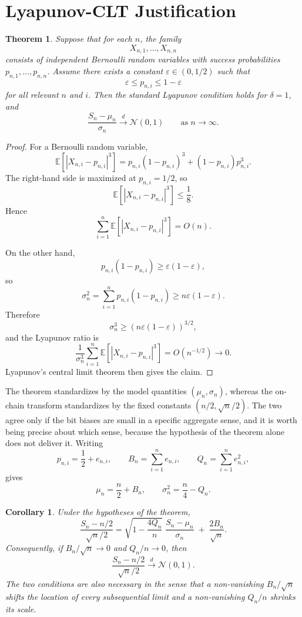 \documentclass[11pt]{article}
\newtheorem{theorem}{Theorem}
\newtheorem{corollary}{Corollary}
\begin{document}
\section{Lyapunov-CLT Justification}
\label{sec:lyapunov}

\begin{theorem}
Suppose that for each $n$, the family
\[
X_{n,1}, \dots, X_{n,n}
\]
consists of independent Bernoulli random variables with success probabilities
$p_{n,1}, \dots, p_{n,n}$. Assume there exists a constant
$\varepsilon \in (0, 1/2)$ such that
\[
\varepsilon \le p_{n,i} \le 1-\varepsilon
\]
for all relevant $n$ and $i$. Then the standard Lyapunov condition holds for
$\delta=1$, and
\[
\frac{S_n - \mu_n}{\sigma_n}
\xrightarrow{d}
\mathcal{N}(0,1)
\qquad \text{as } n \to \infty.
\]
\end{theorem}

\begin{proof}
For a Bernoulli random variable,
\[
\mathbb{E}\left[\left|X_{n,i} - p_{n,i}\right|^3\right]
= p_{n,i}(1-p_{n,i})^3 + (1-p_{n,i})p_{n,i}^3.
\]
The right-hand side is maximized at $p_{n,i}=1/2$, so
\[
\mathbb{E}\left[\left|X_{n,i} - p_{n,i}\right|^3\right] \le \frac{1}{8}.
\]
Hence
\[
\sum_{i=1}^n \mathbb{E}\left[\left|X_{n,i} - p_{n,i}\right|^3\right] = O(n).
\]

On the other hand,
\[
p_{n,i}(1-p_{n,i}) \ge \varepsilon(1-\varepsilon),
\]
so
\[
\sigma_n^2 = \sum_{i=1}^n p_{n,i}(1-p_{n,i}) \ge n\varepsilon(1-\varepsilon).
\]
Therefore
\[
\sigma_n^3 \ge \left(n\varepsilon(1-\varepsilon)\right)^{3/2},
\]
and the Lyapunov ratio is
\[
\frac{1}{\sigma_n^3}
\sum_{i=1}^n \mathbb{E}\left[\left|X_{n,i} - p_{n,i}\right|^3\right]
= O(n^{-1/2}) \to 0.
\]
Lyapunov's central limit theorem then gives the claim.
\end{proof}

The theorem standardizes by the model quantities $(\mu_n,\sigma_n)$, whereas
the on-chain transform standardizes by the fixed constants
$(n/2,\sqrt{n}/2)$. The two agree only if the bit biases are small in a
specific aggregate sense, and it is worth being precise about which sense,
because the hypothesis of the theorem alone does not deliver it. Writing
\[
p_{n,i} = \frac{1}{2} + e_{n,i},
\qquad
B_n = \sum_{i=1}^{n} e_{n,i},
\qquad
Q_n = \sum_{i=1}^{n} e_{n,i}^2,
\]
gives
\[
\mu_n = \frac{n}{2} + B_n,
\qquad
\sigma_n^2 = \frac{n}{4} - Q_n .
\]

\begin{corollary}
Under the hypotheses of the theorem,
\[
\frac{S_n - n/2}{\sqrt{n}/2}
=
\sqrt{1 - \frac{4Q_n}{n}}\;\frac{S_n-\mu_n}{\sigma_n}
\;+\;\frac{2B_n}{\sqrt{n}} .
\]
Consequently, if $B_n/\sqrt{n}\to 0$ and $Q_n/n\to 0$, then
\[
\frac{S_n - n/2}{\sqrt{n}/2}\xrightarrow{d}\mathcal{N}(0,1).
\]
The two conditions are also necessary in the sense that a non-vanishing
$B_n/\sqrt{n}$ shifts the location of every subsequential limit and a
non-vanishing $Q_n/n$ shrinks its scale.
\end{corollary}
\end{document}
